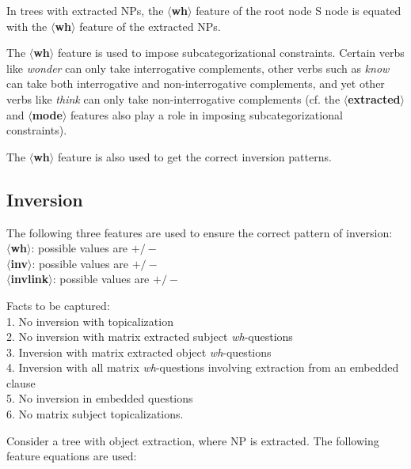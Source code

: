 In trees with extracted NPs, the {\bf $\langle$wh$\rangle$} feature of the 
root node S node is equated with the {\bf $\langle$wh$\rangle$} feature 
of the extracted NPs. 
 
The {\bf $\langle$wh$\rangle$} feature is used to impose 
subcategorizational constraints. 
Certain verbs like {\em wonder} can 
only take interrogative complements, other verbs such as {\em know} 
can take both interrogative and non-interrogative complements, and yet 
other verbs like {\em think} can only take non-interrogative 
complements (cf. the {\bf $\langle$extracted$\rangle$} and {\bf $\langle$mode$\rangle$} features also play a role in imposing 
subcategorizational constraints). 
 
The {\bf $\langle$wh$\rangle$} feature is also used to get the correct 
inversion patterns. 
 
 
\subsection{Inversion} 
The following three features are used to ensure the correct pattern of 
inversion:\\ 
{\bf $\langle$wh$\rangle$}: possible values are {\bf $+/-$}\\ 
{\bf $\langle$inv$\rangle$}: possible values are {\bf $+/-$}\\ 
{\bf $\langle$invlink$\rangle$}: possible values are {\bf $+/-$} 
 
Facts to be captured:\\ 
1. No inversion with topicalization\\ 
2. No inversion with matrix extracted subject {\em wh}-questions\\ 
3. Inversion with matrix extracted object {\em wh}-questions\\ 
4. Inversion with all matrix {\em wh}-questions involving extraction from an 
embedded clause\\ 
5. No inversion in embedded questions \\ 
6. No matrix subject topicalizations. 
 
Consider a tree with object extraction, where NP is extracted. 
The following feature equations are used:\\ 
 
\beginsentences
{}\label{ex:203} 
\label{ex:204} 
\label{ex:205} 
\label{ex:206} 
\endsentences

